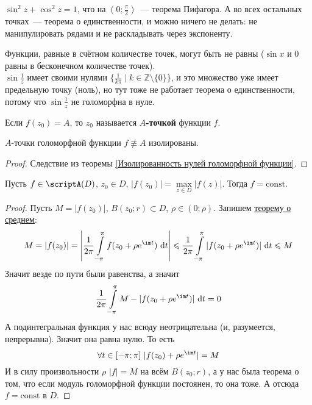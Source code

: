 \documentclass{article}
\begin{document}
    \begin{example}
        $\sin^2z+\cos^2z=1$, что на $\left(0;\frac\pi2\right)$~--- теорема Пифагора. А во всех остальных точках~--- теорема о единственности, и можно ничего не делать: не манипулировать рядами и не раскладывать через экспоненту.
    \end{example}
    \begin{example}
        Функции, равные в счётном количестве точек, могут быть не равны ($\sin x$ и $0$ равны в бесконечном количестве точек).\\
        $\sin\frac1z$ имеет своими нулями $\{\frac1{k\pi}\mid k\in\mathbb Z\setminus\{0\}\}$, и это множество уже имеет предельную точку (ноль), но тут тоже не работает теорема о единственности, потому что $\sin\frac1z$ не голоморфна в нуле.
    \end{example}
    \begin{definition}
        Если $f(z_0)=A$, то $z_0$ называется \textbf{$A$-точкой} функции $f$.
    \end{definition}
    \begin{claim}
        $A$-точки голоморфной функции $f\not\equiv A$ изолированы.
    \end{claim}
    \begin{proof}
        Следствие из теоремы \ref{Изолированность нулей голоморфной функции}.
    \end{proof}
    \begin{theorem}
        \label{Принцип максимума модуля}
        Пусть $f\in\scriptA(D)$, $z_0\in D$, $|f(z_0)|=\max\limits_{z\in D}|f(z)|$. Тогда $f=\mathrm{const}$.
    \end{theorem}
    \begin{proof}
        Пусть $M=|f(z_0)|$, $B(z_0;r)\subset D$, $\rho\in(0;\rho)$. Запишем \hyperref[Теорема о среднем для голоморфных функций]{теорему о среднем}:
        $$
        M=|f(z_0)|=\left|\frac1{2\pi}\int\limits_{-\pi}^\pi f(z_0+\rho e^{\im t})~\mathrm dt\right|\leqslant\frac1{2\pi}\int\limits_{-\pi}^\pi|f(z_0+\rho e^{\im t})|~\mathrm dt\leqslant M
        $$
        Значит везде по пути были равенства, а значит
        $$
        \frac1{2\pi}\int\limits_{-\pi}^\pi M-|f(z_0+\rho e^{\im t})|~\mathrm dt=0
        $$
        А подинтегральная функция у нас всюду неотрицательна (и, разумеется, непрерывна). Значит она равна нулю. То есть
        $$\forall t\in[-\pi;\pi]~|f(z_0)+\rho e^{\im t}|=M$$
        И в силу произвольности $\rho$ $|f|=M$ на всём $B(z_0;r)$, а у нас была теорема о том, что если модуль голоморфной функции постоянен, то она тоже. А отсюда $f=\mathrm{const}$ в $D$.
    \end{proof}
\end{document}

